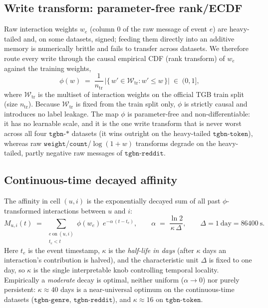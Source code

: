 \documentclass[11pt]{article}
\begin{document}
\subsection{Write transform: parameter-free rank/ECDF}
\label{subsec:write-transform}

Raw interaction weights $w_e$ (column $0$ of the raw message of event $e$) are
heavy-tailed and, on some datasets, signed; feeding them directly into an additive
memory is numerically brittle and fails to transfer across datasets. We therefore
route every write through the causal empirical CDF (rank transform) of $w_e$
against the training weights,
\begin{equation}
\phi(w) \;=\; \frac{1}{n_{\mathrm{tr}}}\,
\bigl|\{\, w' \in \mathcal{W}_{\mathrm{tr}} : w' \le w \,\}\bigr|
\;\in\; (0,1],
\label{eq:phi}
\end{equation}
where $\mathcal{W}_{\mathrm{tr}}$ is the multiset of interaction weights on the
official TGB train split (size $n_{\mathrm{tr}}$). Because $\mathcal{W}_{\mathrm{tr}}$
is fixed from the train split only, $\phi$ is strictly causal and introduces no
label leakage. The map $\phi$ is parameter-free and non-differentiable: it has no
learnable scale, and it is the one write transform that is never worst across all
four $\texttt{tgbn-*}$ datasets (it wins outright on the heavy-tailed
$\texttt{tgbn-token}$), whereas raw $\texttt{weight}$/$\texttt{count}$/$\log(1{+}w)$
transforms degrade on the heavy-tailed, partly negative raw messages of
$\texttt{tgbn-reddit}$.

\subsection{Continuous-time decayed affinity}
\label{subsec:decayed-affinity}

The affinity in cell $(u,i)$ is the exponentially decayed sum of all past
$\phi$-transformed interactions between $u$ and $i$:
\begin{equation}
M_{u,i}(t) \;=\;
\sum_{\substack{e\ \text{on}\ (u,i)\\ t_e < t}}
\phi(w_e)\; e^{-\alpha\,(t - t_e)},
\qquad
\alpha \;=\; \frac{\ln 2}{\kappa\,\Delta},
\qquad
\Delta = 1~\text{day} = 86400~\text{s}.
\label{eq:M}
\end{equation}
Here $t_e$ is the event timestamp, $\kappa$ is the \emph{half-life in days}
(after $\kappa$ days an interaction's contribution is halved), and the
characteristic unit $\Delta$ is fixed to one day, so $\kappa$ is the single
interpretable knob controlling temporal locality. Empirically a \emph{moderate}
decay is optimal, neither uniform ($\alpha\!\to\!0$) nor purely persistent:
$\kappa\approx 40$ days is a near-universal optimum on the continuous-time
datasets ($\texttt{tgbn-genre}$, $\texttt{tgbn-reddit}$), and $\kappa\approx 16$
on $\texttt{tgbn-token}$.
\end{document}
